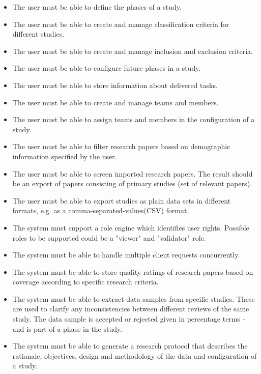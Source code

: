 \begin{itemize}
	\item The user must be able to define the phases of a study. 
	\item The user must be able to create and manage classification criteria for different studies.
	\item The user must be able to create and manage inclusion and exclusion criteria.
	\item The user must be able to configure future phases in a study.
	\item The user must be able to store information about delivered tasks.
	\item The user must be able to create and manage teams and members.
	\item The user must be able to assign teams and members in the configuration of a study. 
	\item The user must be able to filter research papers based on demographic information specified by the user. 
	\item The user must be able to screen imported research papers. The result should be an export of papers consisting of primary studies (set of relevant papers). 
	\item The user must be able to export studies as plain data sets in different formats, e.g. as a comma-separated-values(CSV) format. 
	\item The system must support a role engine which identifies user rights. Possible roles to be supported could be a "viewer" and "validator" role. 
	\item The system must be able to handle multiple client requests concurrently. 
	\item The system must be able to store quality ratings of research papers based on coverage according to specific research criteria.
	\item The system must be able to extract data samples from specific studies. These are used to clarify any inconsistencies between different reviews of the same study. The data sample is accepted or rejected given in percentage terms - and is part of a phase in the study.
	\item The system must be able to generate a research protocol that describes the rationale, objectives, design and methodology of the data and configuration of a study. 
	
\end{itemize}

